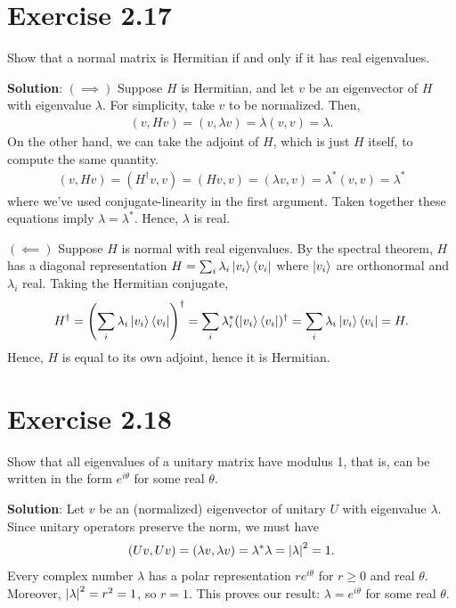 \documentclass{book}
\begin{document}
\section*{Exercise 2.17}
    Show that a normal matrix is Hermitian if and only if it has real eigenvalues.
    
    \textbf{Solution}: $(\implies)$ Suppose $H$ is Hermitian, and let $v$ be an eigenvector of $H$ with eigenvalue $\lambda$. For simplicity, take $v$ to be normalized. Then,
    \begin{align}
        (v, Hv) = (v, \lambda v) = \lambda (v, v) = \lambda. 
    \end{align}
    On the other hand, we can take the adjoint of $H$, which is just $H$ itself, to compute the same quantity.
    \begin{align}
        (v, Hv) = (H^\dagger v, v) = (Hv,v) = (\lambda v, v) = \lambda^* (v,v) = \lambda^*
    \end{align}
    where we've used conjugate-linearity in the first argument. Taken together these equations imply $\lambda = \lambda^*$. Hence, $\lambda$ is real. 
    
    $(\impliedby)$ Suppose $H$ is normal with real eigenvalues. By the spectral theorem, $H$ has a diagonal representation $H = \sum_i \lambda_i \ket{v_i}\bra{v_i}$ where $\ket{v_i}$ are orthonormal and $\lambda_i$ real. Taking the Hermitian conjugate,
    \begin{align}
        H^\dagger = \left(\sum_i \lambda_i \ket{v_i}\bra{v_i}\right)^\dagger
        = \sum_i \lambda_i^* (\ket{v_i}\bra{v_i})^\dagger = \sum_i \lambda_i \ket{v_i}\bra{v_i} = H.
    \end{align}
    Hence, $H$ is equal to its own adjoint, hence it is Hermitian.
    
\section*{Exercise 2.18}
    Show that all eigenvalues of a unitary matrix have modulus 1, that is, can be written in the form $e^{i\theta}$ for some real $\theta$.
    
    \textbf{Solution}: Let $v$ be an (normalized) eigenvector of unitary $U$ with eigenvalue $\lambda$. Since unitary operators preserve the norm, we must have
    \begin{align}
        (Uv, Uv) = (\lambda v, \lambda v) = \lambda^* \lambda = \abs{\lambda}^2 = 1.
    \end{align}
    Every complex number $\lambda$ has a polar representation $r e^{i\theta}$ for $r\geq 0$ and real $\theta$. Moreover, $\abs{\lambda}^2 = r^2 = 1$, so $r = 1$. This proves our result: $\lambda = e^{i\theta}$ for some real $\theta$.
    
\end{document}
